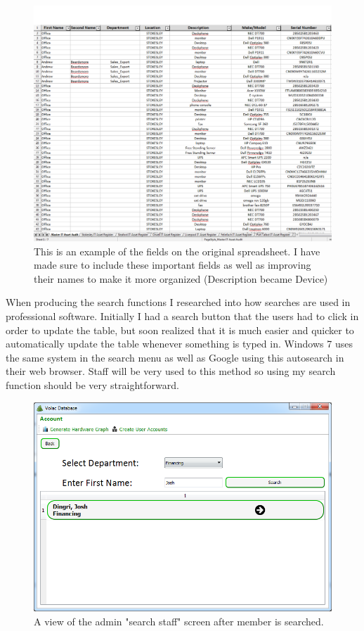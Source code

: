 \begin{figure}[H]
    \includegraphics[width=\textwidth]{./Evaluation/Images/spreadsheet.png}
    \caption{This is an example of the fields on the original spreadsheet. I have made sure to include these important fields as well as improving their names to make it more organized (Description became Device)} 
\end{figure}

When producing the search functions I researched into how searches are used in professional software. Initially I had a search button that the users had to click in order to update the table, but soon realized that it is much easier and quicker to automatically update the table whenever something is typed in. Windows 7 uses the same system in the search menu as well as Google using this autosearch in their web browser. Staff will be very used to this method so using my search function should be very straightforward.

\begin{figure}[H]
    \includegraphics[width=\textwidth]{./Evaluation/Images/afteradv.png}
    \caption{A view of the admin "search staff" screen after member is searched.}
\end{figure}

